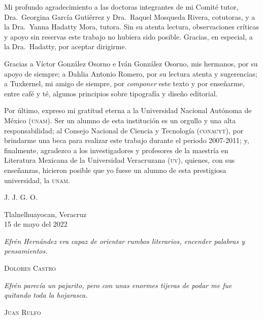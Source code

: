\documentclass[14pt,twoside,final]{extbook} %
\begin{document}
Mi profundo agradecimiento a las doctoras integrantes de mi Comité tutor, Dra.~Georgina García Gutiérrez y Dra.~Raquel Mosqueda Rivera, cotutoras, y a la Dra.~Yanna Hadatty Mora, tutora. Sin su atenta lectura, observaciones críticas y apoyo sin reservas este trabajo no hubiera sido posible. Gracias, en especial, a la Dra.~Hadatty, por aceptar dirigirme.

Gracias a Víctor González Osorno e Iván González Osorno, mis hermanos, por su apoyo de siempre; a Dahlia Antonio Romero, por su lectura atenta y sugerencias; a Tuxkernel, mi amigo de siempre, por \emph{componer} este texto y por enseñarme, entre café y té, algunos principios sobre tipografía y diseño editorial.

Por último, expreso mi gratitud eterna a la Universidad Nacional Autónoma de México (\textsc{unam}). Ser un alumno de esta institución es un orgullo y una alta responsabilidad; al Consejo Nacional de Ciencia y Tecnología (\textsc{conacyt}), por brindarme una beca para realizar este trabajo durante el periodo \mbox{2007-2011}; y, finalmente, agradezco a los investigadores y profesores de la maestría en Literatura Mexicana de la Universidad Veracruzana (\textsc{uv}), quienes, con sus enseñanzas, hicieron posible que yo fuese un alumno de esta prestigiosa universidad, la \textsc{unam}.
\vspace*{28pt}
\begin{flushright}
J. J. G. O.
\end{flushright}
\begin{flushright}
Tlalnelhuayocan, Veracruz \\
15 de mayo del 2022
\end{flushright}
\makeatletter
\renewcommand\@dotsep{200} %
\makeatother
\renewcommand{\contentsname}{Contenidos}
\tableofcontents
{}
\thispagestyle{empty}
\pagestyle{fancy}
\fancyhf{} %
\fancyhead[RO,LE]{\thepage}
\fancyfoot{}
\renewcommand{\headrulewidth}{0pt}
\setcounter{page}{7}
\newpage
\pagestyle{empty}
\null\vfill
\newpage
\pagestyle{empty}
\vspace*{42pt}
\begin{flushright}
\begin{minipage}{7.5cm}
\emph{Efrén Hernández era capaz de orientar rumbos literarios, encender palabras y pensamientos.}
\begin{flushright}
\textsc{Dolores Castro}
\end{flushright}
\vspace*{28pt}
\emph{Efrén parecía un pajarito, pero con unas enormes tijeras de podar me fue quitando toda la hojarasca.}
\begin{flushright}
\textsc{Juan Rulfo}
\end{flushright}
\end{minipage}
\end{flushright}
\end{document}
